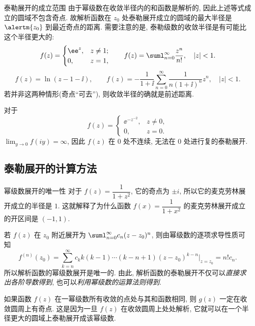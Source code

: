 \begin{frame}{泰勒展开的成立范围}
	\onslide<+->
	由于幂级数在收敛半径内的和函数是解析的, 因此上述等式成立的圆域不包含奇点.
	\onslide<+->
	故解析函数在 $z_0$ 处\alert{泰勒展开成立的圆域的最大半径是 $\alertm{z_0}$ 到最近奇点的距离}.
	\onslide<+->
	需要注意的是, 泰勒级数的收敛半径是有可能比这个半径更大的:
	\[f(z)=\begin{cases}
	\ee^z,&z\neq 1;\\ 0,&z=1,
	\end{cases}\qquad f(z)=\suml_{n=0}^\infty \dfrac{z^n}{n!},\quad |z|<1.
	\]
	\onslide<+->
	\[f(z)=\ln(z-1-\ii ),\qquad f(z)=-\frac1{1+\ii}\sum_{n=0}^\infty\frac1{n(1+\ii)^n}z^n,\quad |z|<1.
	\]
	\onslide<+->
	若并非这两种情形(奇点``可去''), 则收敛半径的确就是前述距离.

	\onslide<+->
	对于
	\[f(z)=\begin{cases}
	\ee^{-z^{-2}},&z\neq 0,\\
	0,&z=0.\end{cases}
	\]
	\onslide<+->
	$\lim_{y\to 0}f(iy)=\infty$, 因此 $f(z)$ 在 $0$ 处不连续, 无法在 $0$ 处进行复的泰勒展开.
\end{frame}


\subsection{泰勒展开的计算方法}
\begin{frame}{幂级数展开的唯一性}
	\onslide<+->
	对于 $f(z)=\dfrac1{1+z^2}$,
	\onslide<+->
	它的奇点为 $\pm i$, 所以它的麦克劳林展开成立的半径是 $1$.
	\onslide<+->
	这就解释了为什么函数 $f(x)=\dfrac1{1+x^2}$ 的麦克劳林展开成立的开区间是 $(-1,1)$.

	\onslide<+->
	若 $f(z)$ 在 $z_0$ 附近展开为 $\suml_{n=0}^\infty c_n(z-z_0)^n$,
	\onslide<+->
	则由幂级数的逐项求导性质可知
	\[f^{(n)}(z_0)=\sum_{k=n}^\infty c_k k(k-1)\cdots(k-n+1)(z-z_0)^{k-n}\Big|_{z=z_0}=n!c_n.
	\]
	\onslide<+->
	所以\alert{解析函数的幂级数展开是唯一的}.
	\onslide<+->
	由此, 解析函数的泰勒展开不仅可以\emph{直接求出各阶导数得到}, 也可以\emph{利用幂级数的运算法则得到}.

	\onslide<+->
	如果函数 $f(z)$ 在一幂级数所有收敛的点处与其和函数相同, 则 $g(z)$ \alert{一定在收敛圆周上有奇点}.
	\onslide<+->
	这是因为一旦 $f(z)$ 在收敛圆周上处处解析, 它就可以在一个半径更大的圆域上泰勒展开成该幂级数.
\end{frame}


